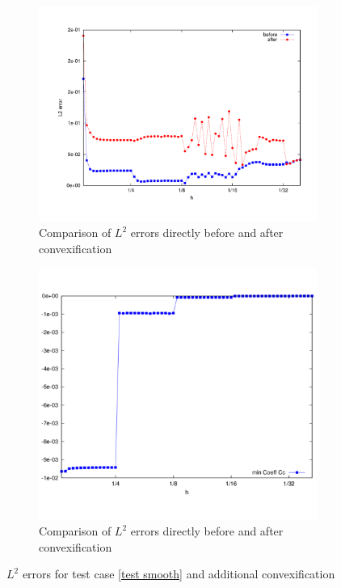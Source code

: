 \begin{figure}[H]
\centering
	\begin{subfigure}{0.45\textwidth}
		\centering
		\includegraphics[scale=0.25]{plots/MA1_convexComp.pdf}
		\caption{Comparison of $L^2$ errors directly before and after convexification}
		\label{fig: convex before after}
	\end{subfigure}
	\begin{subfigure}{0.45\textwidth}
		\centering
		\includegraphics[scale=0.25]{plots/MA1_minCoeff.pdf}
		\caption{Comparison of $L^2$ errors directly before and after convexification}
		\label{fig: convex min coeffs}
	\end{subfigure}	
	\caption{$L^2$ errors for test case \ref{test smooth} and additional convexification}
	\label{fig: Compare test smooth ourMethodConvex}
\end{figure}


